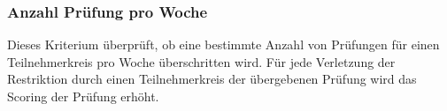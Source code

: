 \subsubsection{Anzahl Prüfung pro Woche}
Dieses Kriterium überprüft, ob eine bestimmte Anzahl von Prüfungen für einen Teilnehmerkreis
pro Woche überschritten wird.
Für jede Verletzung der Restriktion durch einen Teilnehmerkreis der übergebenen Prüfung wird das
Scoring der Prüfung erhöht.



